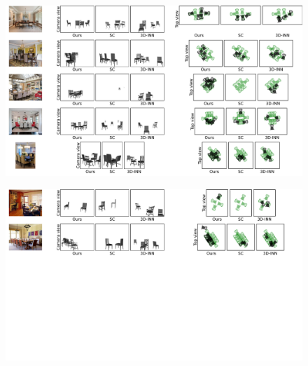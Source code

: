 \begin{figure}
    \includegraphics[width=\textwidth]{figures/qualitative_results/full/qual_results_21.pdf}
\end{figure}
\begin{figure}
    \includegraphics[width=\textwidth]{figures/qualitative_results/full/qual_results_22.pdf}
\end{figure}